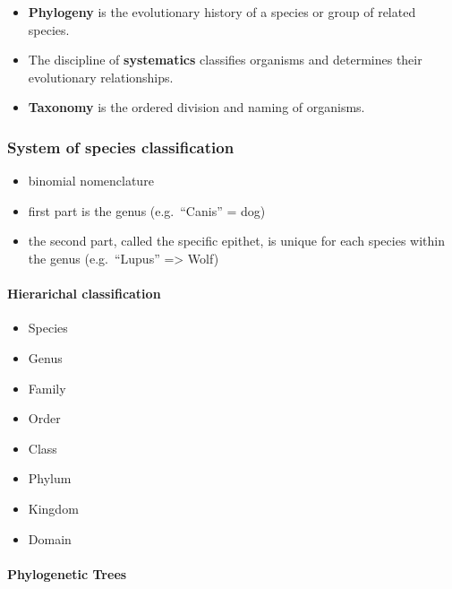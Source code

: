 \begin{itemize}
\tightlist
\item
  \textbf{Phylogeny} is the evolutionary history of a species or group
  of related species.
\item
  The discipline of \textbf{systematics} classifies organisms and
  determines their evolutionary relationships.
\item
  \textbf{Taxonomy} is the ordered division and naming of organisms.
\end{itemize}

\hypertarget{system-of-species-classification}{%
\subsubsection{System of species
classification}\label{system-of-species-classification}}

\begin{itemize}
\tightlist
\item
  binomial nomenclature
\item
  first part is the genus (e.g.~``Canis'' = dog)
\item
  the second part, called the specific epithet, is unique for each
  species within the genus (e.g.~``Lupus'' =\textgreater{} Wolf)
\end{itemize}

\hypertarget{hierarichal-classification}{%
\paragraph{Hierarichal
classification}\label{hierarichal-classification}}

\begin{itemize}
\tightlist
\item
  Species
\item
  Genus
\item
  Family
\item
  Order
\item
  Class
\item
  Phylum
\item
  Kingdom
\item
  Domain
\end{itemize}

\hypertarget{phylogenetic-trees}{%
\paragraph{Phylogenetic Trees}\label{phylogenetic-trees}}

